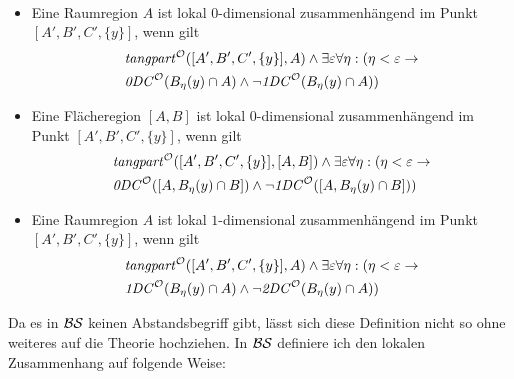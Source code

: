     \begin{dfn}\ \vspace{0pt}

        \begin{itemize}
            \item Eine Raumregion $A$ ist lokal $0$-dimensional zusammenhängend im Punkt $[A', B', C', \{y\}]$, wenn gilt
            \begin{align*}
                &\mathit{tangpart}^\mathcal{O}([A', B', C', \{y\}],A) \land \exists \varepsilon \forall \eta: (\eta < \varepsilon \to 
                \\
                &\mathit{0DC}^\mathcal{O}(B_{\eta}(y) \cap A) \land \neg \mathit{1DC}^\mathcal{O}(B_{\eta}(y) \cap A))
            \end{align*}
            \item Eine Flächeregion $[A,B]$ ist lokal $0$-dimensional zusammenhängend im Punkt $[A', B', C', \{y\}]$, wenn gilt
            \begin{align*}
                &\mathit{tangpart}^\mathcal{O}([A', B', C', \{y\}],[A,B]) \land \exists \varepsilon \forall \eta:
                (\eta < \varepsilon \to
                \\
                &\mathit{0DC}^\mathcal{O}([A,B_{\eta}(y) \cap B]) \land \neg \mathit{1DC}^\mathcal{O}([A,B_{\eta}(y) \cap B]))
            \end{align*}
            \item Eine Raumregion $A$ ist lokal $1$-dimensional zusammenhängend im Punkt $[A', B', C', \{y\}]$, wenn gilt
            \begin{align*}
                &\mathit{tangpart}^\mathcal{O}([A', B', C', \{y\}],A) \land \exists \varepsilon \forall \eta: (\eta < \varepsilon \to 
                \\
                &\mathit{1DC}^\mathcal{O}(B_{\eta}(y) \cap A) \land \neg \mathit{2DC}^\mathcal{O}(B_{\eta}(y) \cap A))
            \end{align*}
        \end{itemize}
        
    \end{dfn}
%     
    Da es in $\mathcal{BS}$ keinen Abstandsbegriff gibt, lässt sich diese Definition nicht so ohne weiteres auf die Theorie hochziehen. 
    In $\mathcal{BS}$ definiere ich den lokalen Zusammenhang auf folgende Weise:
%
